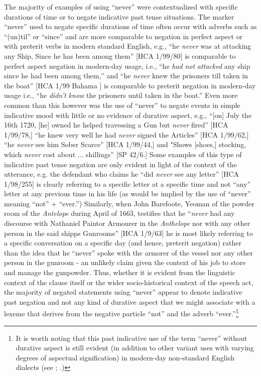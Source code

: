 The majority of examples of using “never” were contextualized with specific durations of time or to negate indicative past tense situations. The marker “never” used to negate specific durations of time often occur with adverbs such as “(un)til” or “since” and are more comparable to negation in perfect aspect or with preterit verbs in modern standard English, e.g., “he \textit{never} was at attacking any Ship, Since he has been among them” [HCA 1/99/80] is comparable to perfect aspect negation in modern-day usage, i.e., “he \textit{had} \textit{not} \textit{attacked} any ship since he had been among them,” and “he \textit{never} knew the prisoners till taken in the boat” [HCA 1/99 Bahama \citealt{Islands1722}] is comparable to preterit negation in modern-day usage i.e., “he \textit{didn't} \textit{know} the prisoners until taken in the boat.” Even more common than this however was the use of “never” to negate events in simple indicative mood with little or no evidence of durative aspect, e.g., “[on] July the 16th 1720, [he] owned he helped travessing a Gun but \textit{never} fired” [HCA 1/99/78,] “he knew very well he had \textit{never} signed the Articles” [HCA 1/99/62,] “he \textit{never} see him Sober Scarce” [HCA 1/99/44,] and "Shows [shoes,] stocking, which \textit{never} cost about ... shillings” [SP 42/6.] Some examples of this type of indicative past tense negation are only evident in light of the context of the utterance, e.g. the defendant who claims he “did \textit{never} see any letter” [HCA 1/98/255] is clearly referring to a specific letter at a specific time and not “any” letter at any previous time in his life (as would be implied by the use of “never” meaning “not” + “ever.”) Similarly, when John Barefoote, Yeoman of the powder room of the \textit{Antelope} during April of 1663, testifies that he “\textit{never} had any discourse with Nathaniel Paintor Armourer in the \textit{Anthelope} nor with any other person in the said shipps Gunroome” [HCA 1/9/63] he is most likely referring to a specific conversation on a specific day (and hence, preterit negation) rather than the idea that he “never” spoke with the armorer of the vessel nor any other person in the gunroom - an unlikely claim given the context of his job to store and manage the gunpowder. Thus, whether it is evident from the linguistic context of the clause itself or the wider socio-historical context of the speech act, the majority of negated statements using “never” appear to denote indicative past negation and not any kind of durative aspect that we might associate with a lexeme that derives from the negative particle “not” and the adverb “ever.”\footnote{It is worth noting that this past indicative use of the term “never” without durative aspect is still evident (in addition to other variant uses with varying degrees of aspectual signification) in modern-day non-standard English dialects (see \citealt{LucasWills2012}; \citealt{Mazzen2004}.)}  

